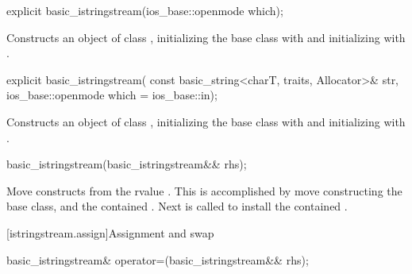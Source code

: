 %
\begin{itemdecl}
explicit basic_istringstream(ios_base::openmode which);
\end{itemdecl}

\begin{itemdescr}
\pnum
\effects
Constructs an object of class
,
initializing the base class with
and initializing  with\linebreak %
.
\end{itemdescr}

%
\begin{itemdecl}
explicit basic_istringstream(
  const basic_string<charT, traits, Allocator>& str,
  ios_base::openmode which = ios_base::in);
\end{itemdecl}

\begin{itemdescr}
\pnum
\effects
Constructs an object of class
,
initializing the base class with
and initializing  with\linebreak %
.
\end{itemdescr}

%
\begin{itemdecl}
basic_istringstream(basic_istringstream&& rhs);
\end{itemdecl}

\begin{itemdescr}
\pnum
\effects Move constructs from the rvalue . This
is accomplished by move constructing the base class, and the contained
.
Next 
is called to
install the contained .
\end{itemdescr}

[istringstream.assign]{Assignment and swap}

%
\begin{itemdecl}
basic_istringstream& operator=(basic_istringstream&& rhs);
\end{itemdecl}

